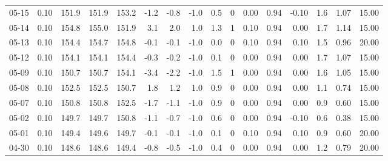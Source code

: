 \begin{threeparttable}
{\begin{tabular}{lrrrrrrrrrrrrrrr}
  05-15 &     0.10 & 151.9 & 151.9 & 153.2 &       -1.2 &           -0.8 &                     -1.0 &                 0.5 &              0 &       0.00 &      0.94 &          -0.10 &              1.6 &            1.07 &                  15.00 \\
  05-14 &     0.10 & 154.8 & 155.0 & 151.9 &        3.1 &            2.0 &                      1.0 &                 1.3 &              1 &       0.10 &      0.94 &           0.00 &              1.7 &            1.14 &                  15.00 \\
  05-13 &     0.10 & 154.4 & 154.7 & 154.8 &       -0.1 &           -0.1 &                     -1.0 &                 0.0 &              0 &       0.10 &      0.94 &           0.10 &              1.5 &            0.96 &                  20.00 \\
  05-12 &     0.10 & 154.1 & 154.1 & 154.4 &       -0.3 &           -0.2 &                     -1.0 &                 0.1 &              0 &       0.00 &      0.94 &           0.00 &              1.7 &            1.07 &                  15.00 \\
  05-09 &     0.10 & 150.7 & 150.7 & 154.1 &       -3.4 &           -2.2 &                     -1.0 &                 1.5 &              1 &       0.00 &      0.94 &           0.00 &              1.6 &            1.05 &                  15.00 \\
  05-08 &     0.10 & 152.5 & 152.5 & 150.7 &        1.8 &            1.2 &                      1.0 &                 0.9 &              0 &       0.00 &      0.94 &           0.00 &              1.1 &            0.74 &                  15.00 \\
  05-07 &     0.10 & 150.8 & 150.8 & 152.5 &       -1.7 &           -1.1 &                     -1.0 &                 0.9 &              0 &       0.00 &      0.94 &           0.00 &              0.9 &            0.60 &                  15.00 \\
  05-02 &     0.10 & 149.7 & 149.7 & 150.8 &       -1.1 &           -0.7 &                     -1.0 &                 0.6 &              0 &       0.00 &      0.94 &          -0.10 &              0.6 &            0.38 &                  15.00 \\
  05-01 &     0.10 & 149.4 & 149.6 & 149.7 &       -0.1 &           -0.1 &                     -1.0 &                 0.1 &              0 &       0.10 &      0.94 &           0.10 &              0.9 &            0.60 &                  20.00 \\
  04-30 &     0.10 & 148.6 & 148.6 & 149.4 &       -0.8 &           -0.5 &                     -1.0 &                 0.4 &              0 &       0.00 &      0.94 &           0.00 &              1.2 &            0.79 &                  20.00 \\

\end{tabular}}
\end{threeparttable}
